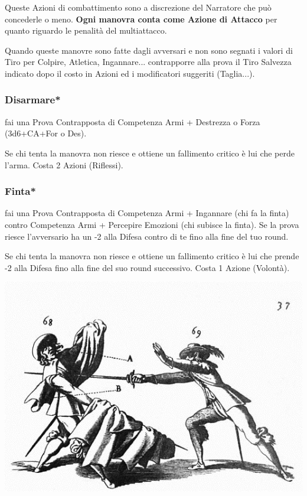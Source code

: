 \begin{multicols}{2}
Queste Azioni di combattimento sono a discrezione del Narratore che può concederle o meno. \textbf{Ogni manovra conta come Azione di Attacco} per quanto riguardo le penalità del multiattacco.

Quando queste manovre sono fatte dagli avversari e non sono segnati i valori di Tiro per Colpire, Atletica, Ingannare... contrapporre alla prova il Tiro Salvezza indicato dopo il costo in Azioni ed i modificatori suggeriti (Taglia...).

\medskip

\subsubsection{Disarmare*}\label{disarmare}\hypertarget{disarmare}{}

fai una Prova Contrapposta di Competenza Armi + Destrezza o Forza (3d6+CA+For o Des).

Se chi tenta la manovra non riesce e ottiene un fallimento critico è lui che perde l'arma. Costa 2 Azioni (Riflessi).

\subsubsection{Finta*} \label{finta}\hypertarget{finta}{}

fai una Prova Contrapposta di Competenza Armi + Ingannare (chi fa la finta) contro Competenza Armi + Percepire Emozioni (chi subisce la finta). Se la prova riesce l'avversario ha un -2 alla Difesa contro di te fino alla fine del tuo round.

Se chi tenta la manovra non riesce e ottiene un fallimento critico è lui che prende -2 alla Difesa fino alla fine del suo round successivo. Costa 1 Azione (Volontà).

\begin{center}
	\includegraphics[width=0.95\linewidth]{immagini/alfieri37.png}
\end{center}


\end{multicols}
